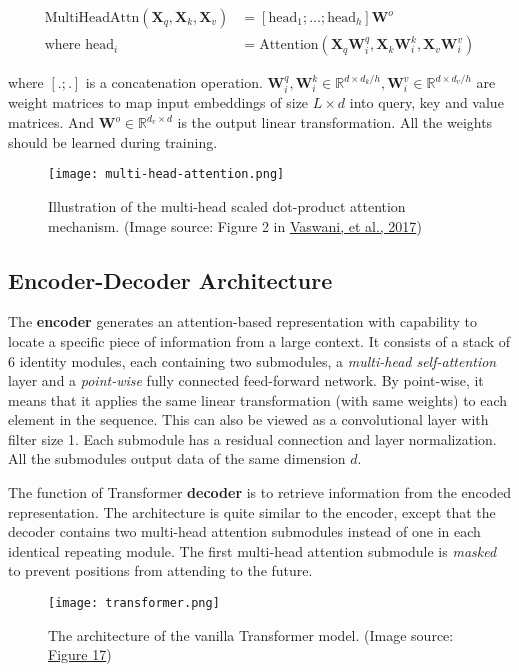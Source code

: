 \documentclass[12pt]{article}
\begin{document}
\[
\begin{aligned}
\text{MultiHeadAttn}(\mathbf{X}_q, \mathbf{X}_k, \mathbf{X}_v) &= [\text{head}_1; \dots; \text{head}_h] \mathbf{W}^o \\ 
\text{where head}_i &= \text{Attention}(\mathbf{X}_q\mathbf{W}^q_i, \mathbf{X}_k\mathbf{W}^k_i, \mathbf{X}_v\mathbf{W}^v_i)
\end{aligned}
\]

where $[.;.]$ is a concatenation operation. $\mathbf{W}^q_i, \mathbf{W}^k_i \in \mathbb{R}^{d \times d_k/h}, \mathbf{W}^v_i \in \mathbb{R}^{d \times d_v/h}$ are weight matrices to map input embeddings of size $L \times d$ into query, key and value matrices. And $\mathbf{W}^o \in \mathbb{R}^{d_v \times d}$ is the output linear transformation. All the weights should be learned during training.

\begin{figure}[h!]
\centering
\texttt{[image: multi-head-attention.png]}
\caption{Illustration of the multi-head scaled dot-product attention mechanism. (Image source: Figure 2 in \href{https://arxiv.org/abs/1706.03762}{Vaswani, et al., 2017})}
\end{figure}

\subsection{Encoder-Decoder Architecture}
The \textbf{encoder} generates an attention-based representation with capability to locate a specific piece of information from a large context. It consists of a stack of 6 identity modules, each containing two submodules, a \emph{multi-head self-attention} layer and a \emph{point-wise} fully connected feed-forward network. By point-wise, it means that it applies the same linear transformation (with same weights) to each element in the sequence. This can also be viewed as a convolutional layer with filter size 1. Each submodule has a residual connection and layer normalization. All the submodules output data of the same dimension $d$.

The function of Transformer \textbf{decoder} is to retrieve information from the encoded representation. The architecture is quite similar to the encoder, except that the decoder contains two multi-head attention submodules instead of one in each identical repeating module. The first multi-head attention submodule is \emph{masked} to prevent positions from attending to the future.

\begin{figure}[h!]
\centering
\texttt{[image: transformer.png]}
\caption{The architecture of the vanilla Transformer model. (Image source: \href{https://lilianweng.github.io/posts/2018-06-24-attention/\#full-architecture}{Figure 17})}
\end{figure}
\end{document}
